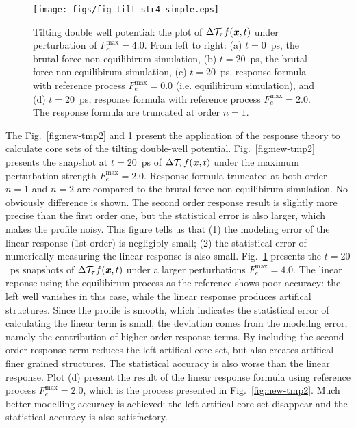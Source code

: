 \documentclass[aip,jcp,a4paper,reprint,onecolumn]{revtex4-1}
\newcommand{\vect}[1]{\textbf{\textit{#1}}}
\newcommand{\mt}{\mathcal T}
\begin{document}
\begin{figure}
  \centering
  \texttt{[image: figs/fig-tilt-str4-simple.eps]}
  \caption{
    Tilting double well potential:
    the plot of $\Delta\mt_\tau f(\vect x,t)$  under perturbation of
    $F_e^{\textrm{max}} = 4.0$.
    From left to right:
    (a) $t=0$~\textsf{ps},
    the brutal force non-equilibirum simulation,
    (b) $t=20$~\textsf{ps},
    the brutal force non-equilibirum simulation,
    (c) $t=20$~\textsf{ps},
    response formula with reference process $F_e^{\max} = 0.0$
    (i.e. equilibirum simulation),
    and
    (d) $t=20$~\textsf{ps},
    response formula with reference process $F_e^{\max} = 2.0$.
    The response formula are truncated at order $n=1$.
  }
  \label{fig:new-tmp3}
\end{figure}



The Fig.~\ref{fig:new-tmp2} and \ref{fig:new-tmp3} present
the application of the response theory to
calculate core sets of the tilting double-well potential.
Fig.~\ref{fig:new-tmp2} presents
the snapshot at $t=20$~\textsf{ps}
of $\Delta\mt_\tau f(\vect x,t)$ under the maximum perturbation
strength $F_e^{\max} = 2.0$. Response formula truncated
at both order $n=1$ and $n=2$ are compared to 
the brutal force non-equilibirum simulation.
No obviously difference is shown. The second order response result
is slightly more precise than the first order one, but the
statistical error is also larger, which makes the profile noisy.
This figure tells us that
(1) the modeling error of the linear response (1st order) is
negligibly small; (2) the statistical error of numerically measuring the
linear response is also small.
Fig.~\ref{fig:new-tmp3} presents the $t=20$~\textsf{ps}
snapshots of $\Delta\mt_\tau f(\vect x,t)$
under a larger perturbations $F_e^{\max} = 4.0$.
The linear reponse using the equilibirum process as the reference
shows poor accuracy: the left well vanishes in this case,
while the linear response produces  artifical structures.
Since the profile is smooth, which indicates
the statistical error of calculating the linear term is small,
the deviation comes from the modellng error, namely the contribution
of higher order response terms.
By including the second order response term reduces the left
artifical core set, but also creates artifical finer grained
structures. The statistical accuracy is also worse than the linear response.
Plot (d) present the result of the linear response
formula using reference process $F_e^{\max} = 2.0$, which
is the process presented in Fig.~\ref{fig:new-tmp2}.
Much better modelling accuracy is achieved:
the left artifical core set disappear and the
statistical accuracy is also satisfactory.
\end{document}
